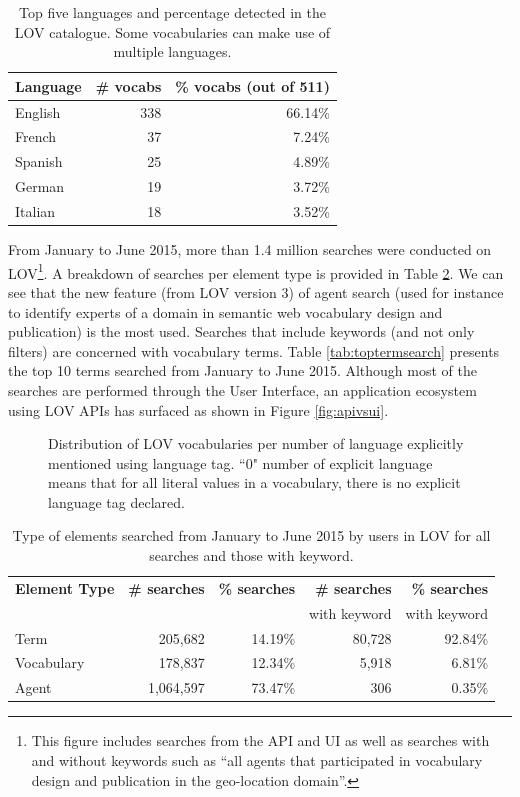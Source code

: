 \documentclass{iosart2c}
\begin{document}
 \begin{table}[h!tb]
\caption{Top five languages and percentage detected in the LOV catalogue. Some vocabularies can make use of multiple languages.}
\begin{tabular}{lrr}
\hline
\textbf{Language} & \textbf{\# vocabs} & \textbf{\% vocabs (out of 511)}  \\ \hline
English & 338 & 66.14\%      \\
French & 37 & 7.24\%      \\
Spanish & 25 & 4.89\%      \\
German & 19 & 3.72\%      \\
Italian & 18 & 3.52\%      \\
\hline  
\end{tabular}
\label{tab:language}
\end{table}


From January to June 2015, more than 1.4 million searches were conducted on LOV\footnote{This figure includes searches from the API and UI as well as searches with and without keywords such as ``all agents that participated in vocabulary design and publication in the geo-location domain''.}. A breakdown of searches per element type is provided in Table \ref{tab:searchcategory}. We can see that the new feature (from LOV version 3) of agent search (used for instance to identify experts of a domain in semantic web vocabulary design and publication) is the most used. Searches that include keywords (and not only filters) are concerned with vocabulary terms. Table \ref{tab:toptermsearch} presents the top 10 terms searched from January to June 2015. Although most of the searches are performed through the User Interface, an application ecosystem using LOV APIs has surfaced as shown in Figure \ref{fig:apivsui}. 

\begin{figure}[htb]
\resizebox{\linewidth}{!}{}
\caption{\label{fig:langdist} Distribution of LOV vocabularies per number of language explicitly mentioned using language tag. ``0" number of explicit language means that for all literal values in a vocabulary, there is no explicit language tag declared.}
\end{figure}


\begin{table}[h!tb]
\caption{Type of elements searched from January to June 2015 by users in LOV for all searches and those with keyword.}
\begin{tabular}{l|rr|rr}
\hline
\textbf{Element Type } & \textbf{\# searches} & \textbf{\% searches} & \textbf{\# searches} & \textbf{\% searches} \\
 &  & & with keyword & with keyword \\ \hline
Term & 205,682 & 14.19\% & 80,728 & 92.84\% \\
Vocabulary & 178,837 & 12.34\% & 5,918 & 6.81\% \\
Agent & 1,064,597 & 73.47\% & 306 & 0.35\% \\
\hline  
\end{tabular}
\label{tab:searchcategory}
\end{table}
\end{document}
